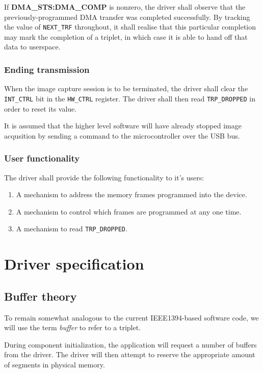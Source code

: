 \documentclass[12pt]{article}
\begin{document}
If \textbf{DMA\_STS:DMA\_COMP} is nonzero, the driver shall observe that the previously-programmed DMA transfer was completed successfully. By tracking the value of \texttt{NEXT\_TRF} throughout, it shall realise that this particular completion may mark the completion of a triplet, in which case it is able to hand off that data to userspace.

\subsubsection{Ending transmission}

When the image capture session is to be terminated, the driver shall clear the \texttt{INT\_CTRL} bit in the \texttt{HW\_CTRL} register. The driver shall then read \texttt{TRP\_DROPPED} in order to reset its value.

It is assumed that the higher level software will have already stopped image acqusition by sending a command to the microcontroller over the USB bus.

\subsubsection{User functionality}

The driver shall provide the following functionality to it's users:

\begin{enumerate}
\item A mechanism to address the memory frames programmed into the device.
\item A mechanism to control which frames are programmed at any one time.
\item A mechanism to read \texttt{TRP\_DROPPED}.
\end{enumerate}

\section{Driver specification}

\subsection{Buffer theory}

To remain somewhat analogous to the current IEEE1394-based software code, we will use the term \textit{buffer} to refer to a triplet.

During component initialization, the application will request a number of buffers from the driver. The driver will then attempt to reserve the appropriate amount of segments in physical memory.
\end{document}
